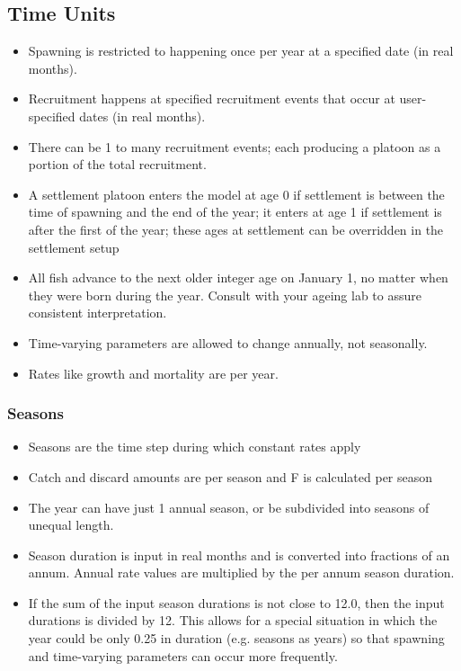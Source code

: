 \hypertarget{RecrTiming}{}
\subsection{Time Units}
	\begin{itemize}
		\item Spawning is restricted to happening once per year at a specified date (in real months).
		\item Recruitment happens at specified recruitment events that occur at user-specified dates (in real months).  \item There can be 1 to many recruitment events; each producing a platoon as a portion of the total recruitment.
		\item A settlement platoon enters the model at age 0 if settlement is between the time of spawning and the end of the year; it enters at age 1 if settlement is after the first of the year; these ages at settlement can be overridden in the settlement setup
        \item All fish advance to the next older integer age on January 1, no matter when they were born during the year.  Consult with your ageing lab to assure consistent interpretation.
		\item Time-varying parameters are allowed to change annually, not seasonally.
		\item Rates like growth and mortality are per year.
	\end{itemize}
	
\subsubsection{Seasons}
	 \begin{itemize}
	 	\item Seasons are the time step during which constant rates apply
	 	\item Catch and discard amounts are per season and F is calculated per season
	 	\item The year can have just 1 annual season, or be subdivided into seasons of unequal length.
	 	\item Season duration is input in real months and is converted into fractions of an annum.  Annual rate values are multiplied by the per annum season duration.
	 	\item If the sum of the input season durations is not close to 12.0, then the input durations is divided by 12.  This allows for a special situation in which the year could be only 0.25 in duration (e.g. seasons as years) so that spawning and time-varying parameters can occur more frequently.	 	
	 \end{itemize}

